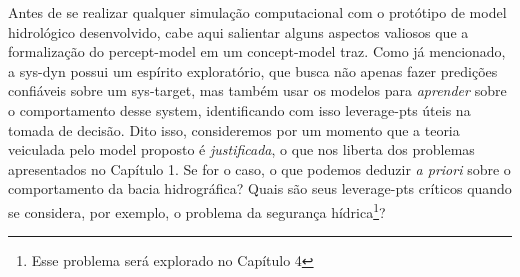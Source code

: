 \documentclass[./main.tex]{subfiles}
\begin{document}
\par Antes de se realizar qualquer simulação computacional com o protótipo de \gls{model} hidrológico desenvolvido, cabe aqui salientar alguns aspectos valiosos que a formalização do \gls{percept-model} em um \gls{concept-model} traz. Como já mencionado, a \gls{sys-dyn} possui um espírito exploratório, que busca não apenas fazer predições confiáveis sobre um \gls{sys-target}, mas também usar os modelos para \textit{aprender} sobre o comportamento desse \gls{system}, identificando com isso \gls{leverage-pts} úteis na tomada de decisão. Dito isso, consideremos por um momento que a \gls{teoria} veiculada pelo \gls{model} proposto é \textit{justificada}, o que nos liberta dos problemas apresentados no Capítulo 1. Se for o caso, o que podemos deduzir \textit{a priori} sobre o comportamento da bacia hidrográfica? Quais são seus \gls{leverage-pts} críticos quando se considera, por exemplo, o problema da segurança hídrica\footnote{Esse problema será explorado no Capítulo 4}?  
\end{document}
